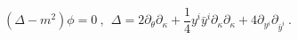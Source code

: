 \begin{equation} 
(\Delta - m^2) \phi = 0 ~,~~
  \Delta = 2 \partial_{\theta} \partial_{\kappa}
         + \frac{1}{4} y^i \bar y^i   \partial_{\kappa} \partial_{\kappa}
         + 4 \partial_{y^i} \partial_{\bar y^i}  ~.
\label{KG}
\end{equation}

